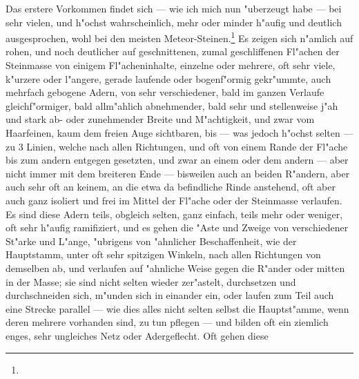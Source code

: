 \documentclass[a4paper, 11pt, oneside, german]{article}
\begin{document}
Das erstere Vorkommen findet sich --- wie ich mich nun "uberzeugt habe --- bei sehr vielen, und h"ochst wahrscheinlich, mehr oder minder h"aufig und deutlich ausgesprochen, wohl bei den meisten Meteor-Steinen.\footnote{} Es zeigen sich n"amlich auf rohen, und noch deutlicher auf geschnittenen, zumal geschliffenen Fl"achen der Steinmasse von einigem Fl"acheninhalte, einzelne oder mehrere, oft sehr viele, k"urzere oder l"angere, gerade laufende oder bogenf"ormig gekr"ummte, auch mehrfach gebogene Adern, von sehr verschiedener, bald im ganzen Verlaufe gleichf"ormiger, bald allm"ahlich abnehmender, bald sehr und stellenweise j"ah und stark ab- oder zunehmender Breite und M"achtigkeit, und zwar vom Haarfeinen, kaum dem freien Auge sichtbaren, bis --- was jedoch h"ochst selten --- zu 3 Linien, welche nach allen Richtungen, und oft von einem Rande der Fl"ache bis zum andern entgegen gesetzten, und zwar an einem oder dem andern --- aber nicht immer mit dem breiteren Ende --- bisweilen auch an beiden R"andern, aber auch sehr oft an keinem, an die etwa da befindliche Rinde anstehend, oft aber auch ganz isoliert und frei im Mittel der Fl"ache oder der Steinmasse verlaufen. Es sind diese Adern teils, obgleich selten, ganz einfach, teils mehr oder weniger, oft sehr h"aufig ramifiziert, und es gehen die "Aste und Zweige von verschiedener St"arke und L"ange, "ubrigens von "ahnlicher Beschaffenheit, wie der Hauptstamm, unter oft sehr spitzigen Winkeln, nach allen Richtungen von demselben ab, und verlaufen auf "ahnliche Weise gegen die R"ander oder mitten in der Masse; sie sind nicht selten wieder zer"astelt, durchsetzen und durchschneiden sich, m"unden sich in einander ein, oder laufen zum Teil auch eine Strecke parallel --- wie dies alles nicht selten selbst die Hauptst"amme, wenn deren mehrere vorhanden sind, zu tun pflegen --- und bilden oft ein ziemlich enges, sehr ungleiches Netz oder Adergeflecht. Oft gehen diese 
\end{document}
